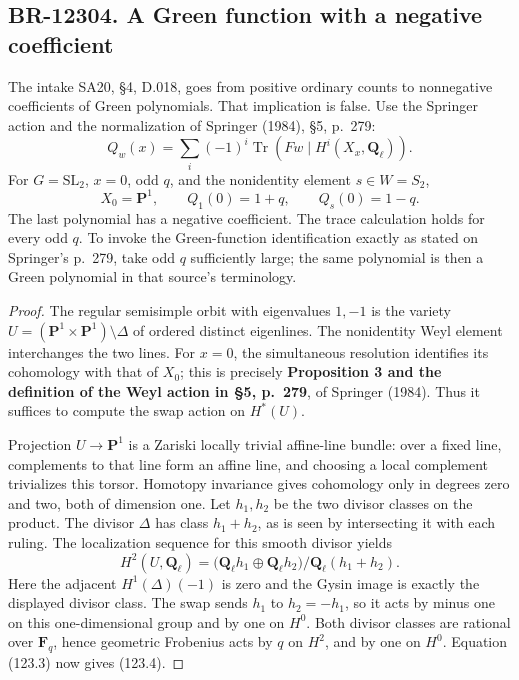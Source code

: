\documentclass[11pt,a4paper]{article}
\theoremstyle{definition}\newtheorem{definition}[theorem]{Definition}
\theoremstyle{remark}\newtheorem{remark}[theorem]{Remark}
\begin{document}
\subsection{BR-12304. A Green function with a negative coefficient}
The intake SA20, \S4, D.018, goes from positive ordinary
counts to nonnegative coefficients of Green polynomials.
That implication is false. Use the Springer action and the
normalization of Springer (1984), \S5, p.~279:
\[
 Q_w(x)=\sum_i(-1)^i\operatorname{Tr}
       (Fw\mid H^i(X_x,\mathbf Q_\ell)).
 \tag{123.3}
\]
For \(G=\mathrm{SL}_2\), \(x=0\), odd \(q\), and the
nonidentity element \(s\in W=S_2\),
\[
 X_0=\mathbf P^1,\qquad Q_1(0)=1+q,
       \qquad Q_s(0)=1-q.
 \tag{123.4}
\]
The last polynomial has a negative coefficient. The
trace calculation holds for every odd \(q\). To invoke
the Green-function identification exactly as stated on
Springer's p.~279, take odd \(q\) sufficiently large;
the same polynomial is then a Green polynomial in that
source's terminology.

\begin{proof}
The regular semisimple orbit with eigenvalues \(1,-1\)
is the variety
\(U=(\mathbf P^1\times\mathbf P^1)\setminus\Delta\)
of ordered distinct eigenlines. The nonidentity Weyl element
interchanges the two lines. For \(x=0\), the simultaneous
resolution identifies its cohomology with that of \(X_0\);
this is precisely \textbf{Proposition 3 and the definition
of the Weyl action in \S5, p.~279}, of Springer (1984).
Thus it suffices to compute the swap action on \(H^*(U)\).

Projection \(U\to\mathbf P^1\) is a Zariski locally trivial
affine-line bundle: over a fixed line, complements to that
line form an affine line, and choosing a local complement
trivializes this torsor. Homotopy invariance gives cohomology
only in degrees zero and two, both of dimension one.
Let \(h_1,h_2\) be the two divisor classes on the product.
The divisor \(\Delta\) has class \(h_1+h_2\), as is seen
by intersecting it with each ruling. The localization
sequence for this smooth divisor yields
\[
 H^2(U,\mathbf Q_\ell)
   =\bigl(\mathbf Q_\ell h_1\oplus\mathbf Q_\ell h_2\bigr)
       /\mathbf Q_\ell(h_1+h_2).
\]
Here the adjacent \(H^1(\Delta)(-1)\) is zero and the
Gysin image is exactly the displayed divisor class.
The swap sends \(h_1\) to \(h_2=-h_1\), so it acts
by minus one on this one-dimensional group and by one
on \(H^0\). Both divisor classes are rational over
\(\mathbf F_q\), hence geometric Frobenius acts by
\(q\) on \(H^2\), and by one on \(H^0\).
Equation (123.3) now gives (123.4).
\end{proof}
\end{document}

